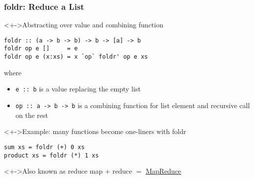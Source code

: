 \documentclass{beamer}
\begin{document}
\begin{frame}[fragile]
  \frametitle{foldr: Reduce a List }
  \begin{block}<+->{Abstracting over value and combining function}
\begin{lstlisting}
foldr :: (a -> b -> b) -> b -> [a] -> b
foldr op e []     = e
foldr op e (x:xs) = x `op` foldr' op e xs
\end{lstlisting}
    where
    \begin{itemize}
    \item \texttt{e :: b} is a value replacing the empty list
    \item \texttt{op :: a -> b -> b} is a combining function for list
      element and recursive call on the rest
    \end{itemize}
  \end{block}
  \begin{exampleblock}<+->{Example: many functions become one-liners with foldr}
\begin{lstlisting}
sum xs = foldr (+) 0 xs
product xs = foldr (*) 1 xs
\end{lstlisting}
  \end{exampleblock}
  \begin{alertblock}<+->{Also known as reduce}
    map $+$ reduce $=$ \href{https://en.wikipedia.org/wiki/MapReduce}{MapReduce}
  \end{alertblock}
\end{frame}
\end{document}
